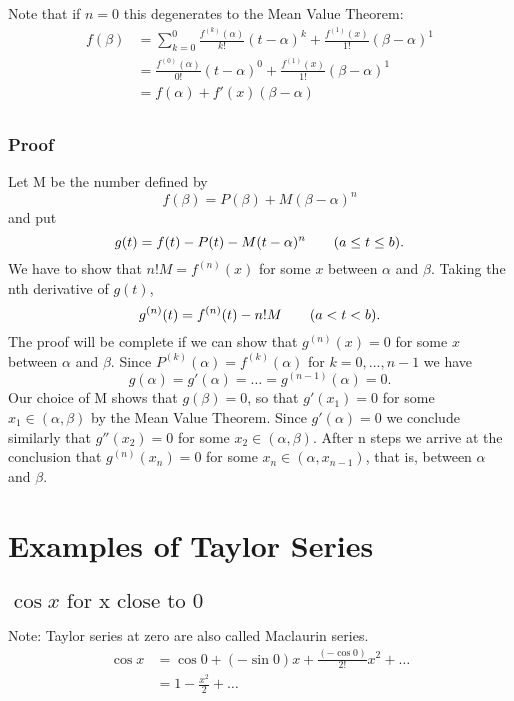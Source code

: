 \documentclass[MathsNotesBase.tex]{subfiles}
\begin{document}
	Note that if $n = 0$ this degenerates to the Mean Value Theorem:
	\begin{align*}
	f(\beta) &= \sum_{k = 0}^{0}\frac{f^{(k)}(\alpha)}{k!}(t - \alpha)^k + \frac{f^{(1)}(x)}{1!}(\beta - \alpha)^1 \\
	&= \frac{f^{(0)}(\alpha)}{0!}(t - \alpha)^0 + \frac{f^{(1)}(x)}{1!}(\beta - \alpha)^1 \\
	&= f(\alpha) + f'(x)(\beta - \alpha) \\
	\end{align*}
	
		\subsubsection*{Proof}
		Let M be the number defined by 
			\[ f(\beta) = P(\beta) + M(\beta - \alpha)^n \]
		and put
			\[ g(t) = f(t) - P(t) - M(t - \alpha)^n \hspace*{20pt} (a \leq t \leq b). \]
		We have to show that $n!M = f^{(n)}(x)$ for some $x$ between $\alpha$ and $\beta$. Taking the nth derivative of $g(t)$,
			\[ g^{(n)}(t) = f^{(n)}(t) - n!M \hspace*{20pt} (a < t < b).\]
		The proof will be complete if we can show that $g^{(n)}(x) = 0$ for some $x$ between $\alpha$ and $\beta$. Since $P^{(k)}(\alpha) = f^{(k)}(\alpha)$ for $k = 0,\ldots, n-1$ we have
			\[ g(\alpha) = g'(\alpha) = \ldots = g^{(n - 1)}(\alpha) = 0. \]
		Our choice of M shows that $g(\beta) = 0$, so that $g'(x_1) = 0$ for some $x_1 \in (\alpha, \beta)$ by the Mean Value Theorem. Since $g'(\alpha) = 0$ we conclude similarly that $g''(x_2) = 0$ for some $x_2 \in (\alpha, \beta)$. After n steps we arrive at the conclusion that $g^{(n)}(x_n) = 0$ for some $x_n \in (\alpha, x_{n-1})$, that is, between $\alpha$ and $\beta$.

\bigskip		
\section*{Examples of Taylor Series}
\bigskip

	\subsection*{$\cos{x} \text{ for x close to }0$}
	Note: Taylor series at zero are also called Maclaurin series.
	\begin{align*}
	\cos{x} &= \cos{0} + (-\sin{0})x + \frac{(-\cos{0})}{2!}x^2 + \ldots \\
	&= 1 - \frac{x^2}{2} + \ldots
	\end{align*}
	
\end{document}
